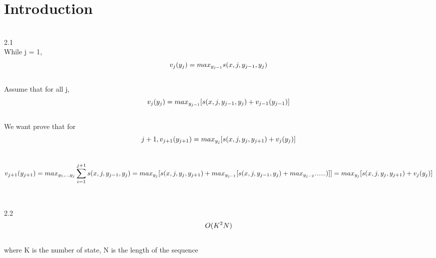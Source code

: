 \documentclass{article}
\begin{document}
\maketitle

\section{Introduction}
\\2.1
\\While j = 1, 
\begin{equation*}
\\v_j(y_j) = max_{{y_{j-1}}} s(x,j,y_{j-1},y_j)
\end{equation*}
    \\Assume that for all j, 
\begin{equation*}
\\v_j(y_j) = max_{{y_{j-1}}} [s(x,j,y_{j-1},y_j) + v_{j-1}(y_{j-1})]
\end{equation*}
\\We want prove that for 
\begin{equation*}
{j+1}, \\v_{j+1}(y_{j+1}) = max_{{y_{j}}} [s(x,j,y_{j},y_{j+1}) + v_{j}(y_{j})]
\end{equation*}
\\
\begin{equation*}
\\v_{j+1}(y_{j+1}) = max_{{y_1},..,{y_{j}}}\sum_{i=1}^{j+1}s(x,j,y_{j-1},y_j)
= max_{{y_{j}}} [s(x,j,y_{j},y_{j+1}) + max_{{y_{j-1}}} [s(x,j,y_{j-1},y_j) + max_{{y_{j-2}}}......)]] = max_{{y_{j}}} [s(x,j,y_{j},y_{j+1}) + v_{j}(y_{j})]
\end{equation*}
\\
\\2.2
\begin{equation*}
\\O(K^2N) 
\end{equation*}
\\where K is the number of state, N is the length of the sequence
\end{document}

